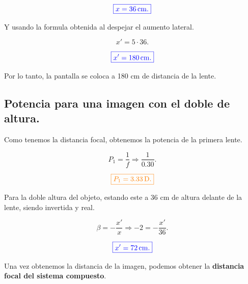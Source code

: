 \documentclass[a4paper,12pt]{article} %
\begin{document}
\vspace{\baselineskip}

\[\textcolor{blue}{\boxed{x = 36 \, \mathrm{cm}.}}\]

\begin{justify}
	Y usando la formula obtenida al despejar el aumento lateral.
\end{justify}

\[ x' = 5 \cdot 36. \]

\vspace{\baselineskip}

\[\textcolor{blue}{\boxed{x' = 180 \, \mathrm{cm}.}}\]

\vspace{\baselineskip}

\begin{justify}
	Por lo tanto, la pantalla se coloca a 180 cm de distancia de la lente.
\end{justify}

\vspace{\baselineskip}

\subsection{Potencia para una imagen con el doble de altura.}

\begin{justify}
	Como tenemos la distancia focal, obtenemos la potencia de la primera lente.
\end{justify}

\[P_1 = \frac{1}{f} \Rightarrow \frac{1}{0.30}. \]

\vspace{\baselineskip}

\[ \textcolor{orange}{\boxed{P_1 = 3.33 \, \mathrm{D}.}} \]

\begin{justify}
	Para la doble altura del objeto, estando este a 36 cm de altura delante de la lente, siendo invertida y real.
\end{justify}

\[ \beta = - \frac{x'}{x} \Rightarrow -2 = - \frac{x'}{36}. \]
\vspace{\baselineskip}

\[\textcolor{blue}{\boxed{x' = 72 \, \mathrm{cm}.}}\]

\begin{justify}
	Una vez obtenemos la distancia de la imagen, podemos obtener la \textbf{distancia focal del sistema compuesto}. 
\end{justify}
\end{document}
